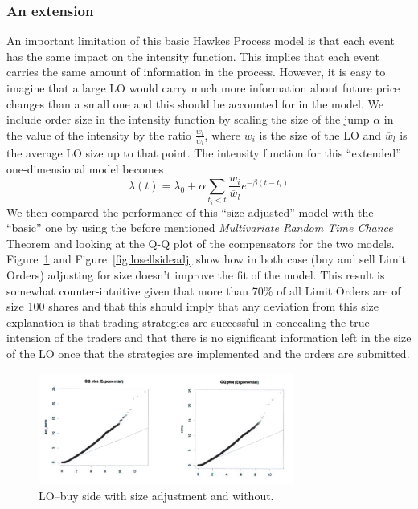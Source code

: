 \subsubsection{An extension}


An important limitation of this basic Hawkes Process model is that each event has the same impact on the intensity function. This implies that each event carries the same amount of information in the process. However, it is easy to imagine that a large LO would carry much more information about future price changes than a small one and this should be accounted for in the model. We include order size in the intensity function by scaling the size of the jump $\alpha$ in the value of the intensity by the ratio $\frac{w_i}{\overline{w}_l}$, where $w_i$ is the size of the LO and $\overline{w}_l$ is the average LO size up to that point. The intensity function for this ``extended'' one-dimensional model becomes
	\[
	\lambda(t)= \lambda_0 + \alpha \sum_{t_i<t} \dfrac{w_i}{\overline{w}_l} e^{-\beta(t-t_i)}
	\]
We then compared the performance of this ``size-adjusted'' model with the ``basic'' one by using the before mentioned \emph{Multivariate Random Time Chance} Theorem and looking at the Q-Q plot of the compensators for the two models. Figure~\ref{fig:lobuysideadj} and Figure~\ref{fig:losellsideadj} show how in both case (buy and sell Limit Orders) adjusting for size doesn't improve the fit of the model. This result is somewhat counter-intuitive given that more than 70\% of all Limit Orders are of size 100 shares and that this should imply that any deviation from this size explanation is that trading strategies are successful in concealing the true intension of the traders and that there is no significant information left in the size of the LO once that the strategies are implemented and the orders are submitted. 
	\begin{figure}[!ht]
   	\centering
   	\includegraphics[width=0.75\textwidth]{chapters/chapter_trade_data_models/figures/lobuysideadj.png} 
   	\caption{LO--buy side with size adjustment and without. \label{fig:lobuysideadj}}
	\end{figure}
